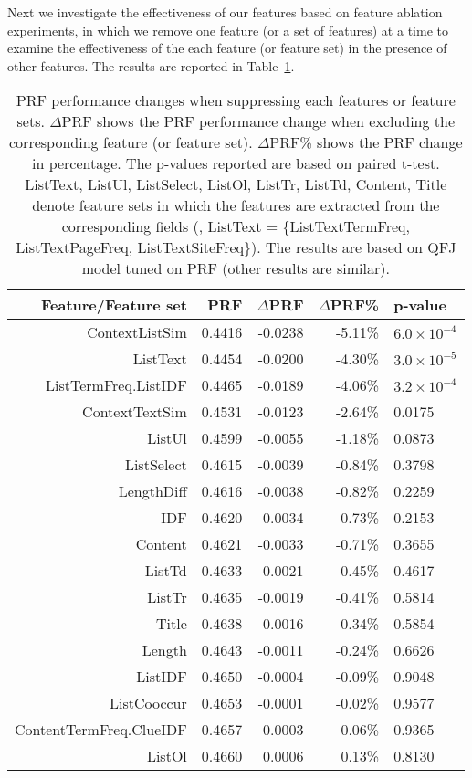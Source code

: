 Next we investigate the effectiveness of our features based on feature ablation experiments, in which we remove one feature (or a set of features) at a time to examine the effectiveness of the each feature (or feature set) in the presence of other features. The results are reported in Table~\ref{tab:intrinsic-ablation}.
\begin{table}[H]
\centering
\caption{PRF performance changes when suppressing each features or feature sets. $\Delta$PRF shows the PRF performance change when excluding the corresponding feature (or feature set). $\Delta$PRF\% shows the PRF change in percentage. The p-values reported are based on paired t-test. ListText, ListUl, ListSelect, ListOl, ListTr, ListTd, Content, Title denote feature sets in which the features are extracted from the corresponding fields (\eg, ListText = \{ListTextTermFreq, ListTextPageFreq, ListTextSiteFreq\}). 
The results are based on QFJ model tuned on PRF (other results are similar).}
\label{tab:intrinsic-ablation}
\begin{tabular}{|r|r|r|r|l|} \hline
Feature/Feature set & PRF & $\Delta$PRF & $\Delta$PRF\% & p-value\\ \hline
ContextListSim & 0.4416 & -0.0238 & -5.11\% & $6.0\times10^{-4}$ \\ \hline
ListText & 0.4454 & -0.0200 & -4.30\% & $3.0\times10^{-5}$ \\ \hline
ListTermFreq.ListIDF & 0.4465 & -0.0189 & -4.06\% & $3.2\times10^{-4}$ \\ \hline
ContextTextSim & 0.4531 & -0.0123 & -2.64\% & 0.0175 \\ \hline
ListUl & 0.4599 & -0.0055 & -1.18\% & 0.0873 \\ \hline
ListSelect & 0.4615 & -0.0039 & -0.84\% & 0.3798 \\ \hline
LengthDiff & 0.4616 & -0.0038 & -0.82\% & 0.2259 \\ \hline
IDF & 0.4620 & -0.0034 & -0.73\% & 0.2153 \\ \hline
Content & 0.4621 & -0.0033 & -0.71\% & 0.3655 \\ \hline
ListTd & 0.4633 & -0.0021 & -0.45\% & 0.4617 \\ \hline
ListTr & 0.4635 & -0.0019 & -0.41\% & 0.5814 \\ \hline
Title & 0.4638 & -0.0016 & -0.34\% & 0.5854 \\ \hline
Length & 0.4643 & -0.0011 & -0.24\% & 0.6626 \\ \hline
ListIDF & 0.4650 & -0.0004 & -0.09\% & 0.9048 \\ \hline
ListCooccur & 0.4653 & -0.0001 & -0.02\% & 0.9577 \\ \hline
ContentTermFreq.ClueIDF & 0.4657 & 0.0003 & 0.06\% & 0.9365 \\ \hline
ListOl & 0.4660 & 0.0006 & 0.13\% & 0.8130 \\ \hline
\end{tabular}
\end{table}

